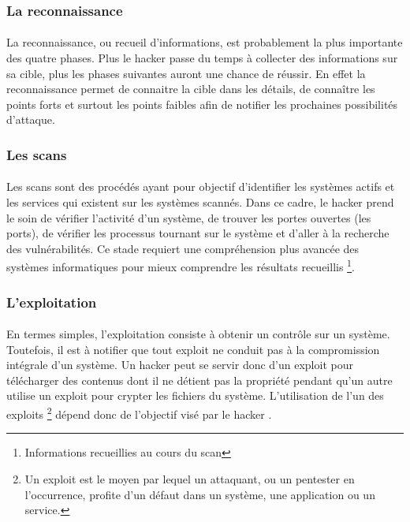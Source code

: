 	  \subsubsection{La reconnaissance}
	    \paragraph{}
	      La reconnaissance, ou recueil d’informations, est probablement la plus importante des quatre phases. Plus le hacker passe du temps à collecter des informations sur sa cible, plus les phases suivantes auront une chance de réussir\cite{c}. En effet la reconnaissance permet de connaitre la cible dans les détails, de connaître les points forts et surtout les points faibles afin de notifier les prochaines possibilités d'attaque.

	  \subsubsection{Les scans}
	    \paragraph{}
	      Les scans sont des procédés ayant pour objectif d’identifier les systèmes actifs et les services qui existent sur les systèmes scannés. Dans ce cadre, le hacker prend le soin de vérifier l'activité d'un système, de trouver les portes ouvertes (les ports), de vérifier les processus tournant sur le système et d'aller à la recherche des vulnérabilités. Ce stade requiert une compréhension plus avancée des systèmes informatiques pour mieux comprendre les résultats recueillis \footnote{Informations recueillies au cours du scan}\cite{c}.
	      
	  \subsubsection{L'exploitation}
	    \paragraph{}
	      En termes simples, l’exploitation consiste à obtenir un contrôle sur un système. Toutefois, il est à notifier que tout exploit ne conduit pas à la compromission intégrale d’un système. Un hacker peut se servir donc d'un exploit pour télécharger des contenus dont il ne détient pas la propriété pendant qu'un autre utilise un exploit pour crypter les fichiers du système. L'utilisation de l'un des exploits \footnote{Un exploit est le moyen par lequel un attaquant, ou un pentester en l’occurrence, profite d’un défaut dans un système, une application ou un service.} dépend donc de l'objectif visé par le hacker \cite{E}.

